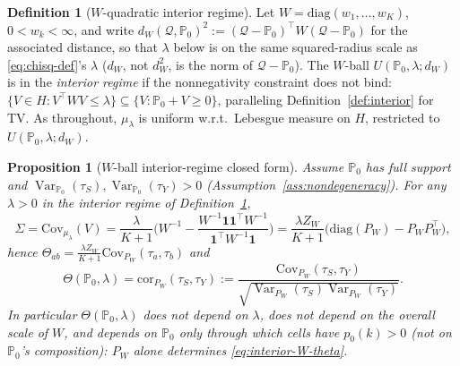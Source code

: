 \documentclass[11pt]{article}
\theoremstyle{plain}
\newtheorem{proposition}[theorem]{Proposition}
\theoremstyle{definition}
\newtheorem{definition}[theorem]{Definition}
\theoremstyle{remark}
\newcommand{\PP}{\mathbb{P}}
\newcommand{\Q}{\mathcal{Q}}
\newcommand{\Cov}{\mathrm{Cov}}
\newcommand{\Corr}{\mathrm{cor}}
\DeclareMathOperator{\Var}{Var}
\begin{document}
\begin{definition}[$W$-quadratic interior regime]\label{def:interior-W}
Let $W=\mathrm{diag}(w_1,\dots,w_K)$, $0<w_k<\infty$, and write
$d_W(\Q,\PP_0)^2:=(\Q-\PP_0)^\top W(\Q-\PP_0)$ for the associated distance, so that
$\lambda$ below is on the same squared-radius scale as \eqref{eq:chisq-def}'s $\lambda$
($d_W$, not $d_W^2$, is the norm of $\Q-\PP_0$). The $W$-ball $U(\PP_0,\lambda;d_W)$ is
in the \emph{interior regime} if the nonnegativity constraint does not bind:
$\{V\in H:V^\top WV\le\lambda\}\subseteq\{V:\PP_0+V\ge0\}$, paralleling
Definition~\ref{def:interior} for TV. As throughout, $\mu_\lambda$ is uniform w.r.t.\
Lebesgue measure on $H$, restricted to $U(\PP_0,\lambda;d_W)$.
\end{definition}

\begin{proposition}[$W$-ball interior-regime closed form]\label{prop:interior-W}
Assume $\PP_0$ has full support and $\Var_{\PP_0}(\tau_S),\Var_{\PP_0}(\tau_Y)>0$
(Assumption~\ref{ass:nondegeneracy}). For any $\lambda>0$ in the interior regime of
Definition~\ref{def:interior-W},
\begin{equation}\label{eq:interior-W}
    \Sigma=\Cov_{\mu_\lambda}(V)
    = \frac\lambda{K+1}\Big(W^{-1}-\frac{W^{-1}\mathbf1\mathbf1^\top W^{-1}}{\mathbf1^\top W^{-1}\mathbf1}\Big)
    = \frac{\lambda Z_W}{K+1}\big(\mathrm{diag}(P_W)-P_WP_W^\top\big),
\end{equation}
hence $\Theta_{ab}=\frac{\lambda Z_W}{K+1}\Cov_{P_W}(\tau_a,\tau_b)$ and
\begin{equation}\label{eq:interior-W-theta}
    \Theta(\PP_0,\lambda) = \Corr_{P_W}(\tau_S,\tau_Y)
    := \frac{\Cov_{P_W}(\tau_S,\tau_Y)}{\sqrt{\Var_{P_W}(\tau_S)\Var_{P_W}(\tau_Y)}}.
\end{equation}
In particular $\Theta(\PP_0,\lambda)$ does not depend on $\lambda$, does not depend on
the overall scale of $W$, and depends on $\PP_0$ only through which cells have
$p_0(k)>0$ (not on $\PP_0$'s composition): $P_W$ alone determines
\eqref{eq:interior-W-theta}.
\end{proposition}
\end{document}
